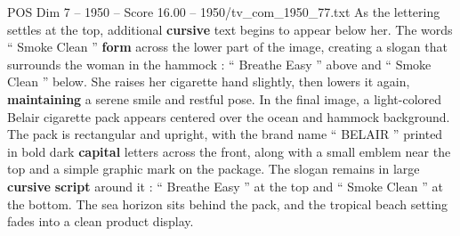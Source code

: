\begin{textsample}{POS Dim 7 – 1950 – Score 16.00 – 1950/tv\_com\_1950\_77.txt}
As the lettering settles at the top, additional \textbf{cursive} text begins to appear below her.
The words “ Smoke Clean ” \textbf{form} across the lower part of the image, creating a slogan that surrounds the woman in the hammock : “ Breathe Easy ” above and “ Smoke Clean ” below.
She raises her cigarette hand slightly, then lowers it again, \textbf{maintaining} a serene smile and restful pose.
In the final image, a light-colored Belair cigarette pack appears centered over the ocean and hammock background.
The pack is rectangular and upright, with the brand name “ BELAIR ” printed in bold dark \textbf{capital} letters across the front, along with a small emblem near the top and a simple graphic mark on the package.
The slogan remains in large \textbf{cursive} \textbf{script} around it : “ Breathe Easy ” at the top and “ Smoke Clean ” at the bottom.
The sea horizon sits behind the pack, and the tropical beach setting fades into a clean product display.

\end{textsample}
